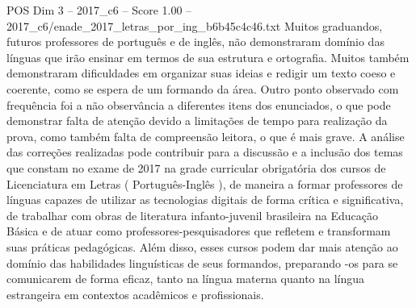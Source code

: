 \begin{textsample}{POS Dim 3 – 2017\_c6 – Score 1.00 – 2017\_c6/enade\_2017\_letras\_por\_ing\_b6b45c4c46.txt}
Muitos graduandos, futuros professores de português e de inglês, não demonstraram domínio das línguas que irão ensinar em termos de sua estrutura e ortografia.
Muitos também demonstraram dificuldades em organizar suas ideias e redigir um texto coeso e coerente, como se espera de um formando da área.
Outro ponto observado com frequência foi a não observância a diferentes itens dos enunciados, o que pode demonstrar falta de atenção devido a limitações de tempo para realização da prova, como também falta de compreensão leitora, o que é mais grave.
A análise das correções realizadas pode contribuir para a discussão e a inclusão dos temas que constam no exame de 2017 na grade curricular obrigatória dos cursos de Licenciatura em Letras ( Português-Inglês ), de maneira a formar professores de línguas capazes de utilizar as tecnologias digitais de forma crítica e significativa, de trabalhar com obras de literatura infanto-juvenil brasileira na Educação Básica e de atuar como professores-pesquisadores que refletem e transformam suas práticas pedagógicas.
Além disso, esses cursos podem dar mais atenção ao domínio das habilidades linguísticas de seus formandos, preparando -os para se comunicarem de forma eficaz, tanto na língua materna quanto na língua estrangeira em contextos acadêmicos e profissionais.

\end{textsample}
